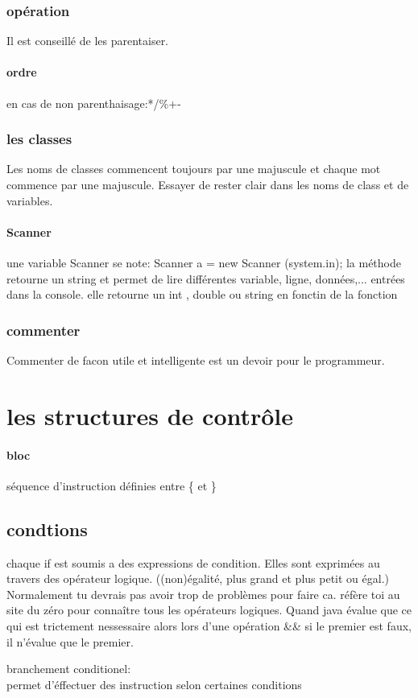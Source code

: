 \documentclass[a4paper,10pt]{article}
\begin{document}
\subsubsection{opération}
Il est conseillé de les parentaiser.
\paragraph{ordre}
en cas de non parenthaisage:*/\%+-
\subsubsection{les classes}
Les noms de classes commencent toujours par une majuscule et chaque mot commence par une majuscule. Essayer de rester clair dans les noms de class et de variables.
\paragraph{Scanner}
une variable Scanner se note: Scanner a = new Scanner (system.in);
\newline
la méthode retourne un string et permet de lire différentes variable, ligne, données,... entrées dans la console. elle retourne un int , double ou string en fonctin de la fonction
\subsubsection{commenter}
Commenter de facon utile et intelligente est un devoir pour le programmeur.

\section{les structures de contrôle}
\paragraph{bloc}
séquence d'instruction définies entre \{ et \}
\subsection{condtions}
chaque if est soumis a des expressions de condition. Elles sont exprimées au travers des opérateur logique. ((non)égalité, plus grand et plus petit ou égal.) Normalement tu devrais pas avoir trop de problèmes pour faire ca. réfère toi au site du zéro pour connaître tous les opérateurs logiques.
Quand java évalue que ce qui est trictement nessessaire alors lors d'une opération \&\& si le premier est faux, il n'évalue que le premier.
\begin{description}
 \item branchement conditionel:\\{permet d'éffectuer des instruction selon certaines conditions}
\end{description}
\end{document}
